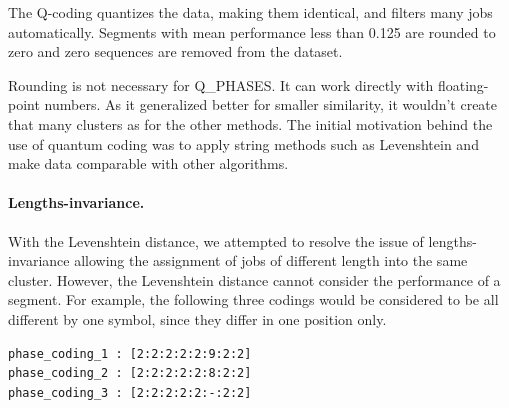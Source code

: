 \documentclass{jhps}
\begin{document}
The Q-coding quantizes the data, making them identical, and filters many jobs automatically.
Segments with mean performance less than 0.125 are rounded to zero and zero sequences are removed from the dataset.

Rounding is not necessary for Q\_PHASES.
It can work directly with floating-point numbers.
As it generalized better for smaller similarity, it wouldn't create that many clusters as for the other methods.
The initial motivation behind the use of quantum coding was to apply string methods such as Levenshtein and make data comparable with other algorithms.



\medskip

\paragraph{Lengths-invariance.}
With the Levenshtein distance, we attempted to resolve the issue of lengths-invariance allowing the assignment of jobs of different length into the same cluster.
However, the Levenshtein distance cannot consider the performance of a segment.
For example, the following three codings would be considered to be all different by one symbol, since they differ in one position only.

\begin{lstlisting}
phase_coding_1 : [2:2:2:2:2:9:2:2]
phase_coding_2 : [2:2:2:2:2:8:2:2]
phase_coding_3 : [2:2:2:2:2:-:2:2]
\end{lstlisting}
\end{document}
